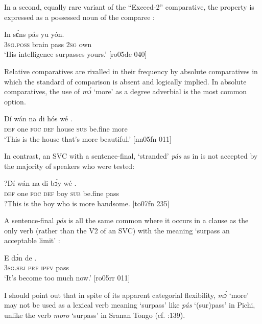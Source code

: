 In a second, equally rare variant of the “Exceed-2” comparative, the property is expressed as a possessed noun of the comparee : 


\ea%
    \label{ex:key:485}
    \gll In    sɛ́ns    pás  yu  yón.\\
\textsc{3sg.poss}  brain  pass  \textsc{2sg}  own\\

\glt ‘His intelligence surpasses yours.’ [ro05de 040]
\z

Relative comparatives are rivalled in their frequency by absolute comparatives in which the standard of comparison is absent and logically implied. In absolute comparatives, the use of \textit{mɔ́} ‘more’ as a degree adverbial  is the most common option. 


\ea%
    \label{ex:key:486}
    \gll Dí  wán    na  di    hós    wé      .\\
\textsc{def}  one    \textsc{foc}  \textsc{def}    house  \textsc{sub}  be.fine    more\\

\glt ‘This is the house that’s more beautiful.’ [nn05fn 011]
\z

In contrast, an SVC with a sentence-final, ‘stranded’ \textit{pás} as in  is not accepted by the majority of speakers who were tested: 


\ea%
    \label{ex:key:487}
    \gll ?Dí  wán  na  di  bɔ́y  wé    .\\
 \textsc{def}  one  \textsc{foc}  \textsc{def}  boy  \textsc{sub}  be.fine  pass\\

\glt ?This is the boy who is more handsome. [to07fn 235]
\z

A sentence-final \textit{pás} is all the same common where it occurs in a clause as the only verb (rather than the V2 of an SVC) with the meaning ‘surpass an acceptable limit’ : 


\ea%
    \label{ex:key:488}
    \gll E    dɔ́n  de  .\\
\textsc{3sg.sbj}  \textsc{prf}  \textsc{ipfv}  pass\\

\glt ‘It’s become too much now.’ [ro05rr 011]
\z

I should point out that in spite of its apparent categorial flexibility, \textit{mɔ́} ‘more’ may not be used as a lexical verb meaning ‘surpass’ like \textit{pás} ‘(sur)pass’ in Pichi, unlike the verb \textit{moro} ‘surpass’ in Sranan Tongo (cf. \citealt{BlankerDubbeldam2010}:139).

